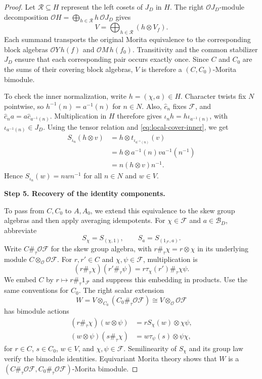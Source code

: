 \documentclass[11pt,a4paper]{article}
\theoremstyle{definition}
\theoremstyle{remark}
\numberwithin{equation}{section}
\newcommand{\cO}{\mathcal{O}}
\newcommand{\proofstep}[1]{%
	\par\addvspace{\medskipamount}%
	\noindent\textbf{#1}\par\nobreak
	\smallskip\nobreak\noindent\ignorespaces
}
\begin{document}
\begin{proof}
		Let $\mathcal R\subseteq H$ represent the left cosets of $J_D$
		in $H$. The right $\cO J_D$-module decomposition
		$\cO H=\bigoplus_{h\in\mathcal R}h\,\cO J_D$ gives
		\[
		V=\bigoplus_{h\in\mathcal R}(h\otimes V_f).
		\]
		Each summand transports the original Morita equivalence to the
		corresponding block algebras
		$\cO Y\,h(f)$ and $\cO M\,h(f_0)$.
		Transitivity and the common stabilizer $J_D$ ensure that each
		corresponding pair occurs exactly once.
		Since $C$ and $C_0$ are the sums of their covering block algebras,
		$V$ is therefore a $(C,C_0)$-Morita bimodule.
		
		To check the inner normalization, write $h=(\chi,a)\in H$.
		Character twists fix $N$ pointwise, so $h^{-1}(n)=a^{-1}(n)$
		for $n\in N$. Also, $\widehat c_n$ fixes $\mathcal F$, and
		$\widehat c_n a=a\widehat c_{a^{-1}(n)}$.
		Multiplication in $H$ therefore gives
		$\iota_n h=h\iota_{a^{-1}(n)}$, with $\iota_{a^{-1}(n)}\in J_D$.
		Using the tensor relation and \eqref{eq:local-cover-inner}, we get
		\[
		\begin{aligned}
			S_{\iota_n}(h\otimes v)
			&=h\otimes t_{\iota_{a^{-1}(n)}}(v)\\
			&=h\otimes a^{-1}(n)v a^{-1}(n^{-1})\\
			&=n(h\otimes v)n^{-1}.
		\end{aligned}
		\]
		Hence $S_{\iota_n}(w)=nwn^{-1}$ for all $n\in N$ and $w\in V$.
		
		\proofstep{Step 5. Recovery of the identity components.}
		To pass from $C,C_0$ to $A,A_0$, we extend this equivalence
		to the skew group algebras and then apply averaging idempotents.
		For $\chi\in\mathcal F$ and $a\in\mathcal B_D$, abbreviate
		\[
		S_\chi=S_{(\chi,1)},\qquad S_a=S_{(1_{\mathcal F},a)}.
		\]
		Write $C\#_\tau\cO\mathcal F$ for the skew group algebra,
		with $r\#_\tau\chi=r\otimes\chi$ in its underlying module
		$C\otimes_\cO\cO\mathcal F$.
		For $r,r'\in C$ and $\chi,\psi\in\mathcal F$, multiplication is
		\[
		(r\#_\tau\chi)(r'\#_\tau\psi)
		=r\tau_\chi(r')\#_\tau\chi\psi.
		\]
		We embed $C$ by $r\mapsto r\#_\tau1_{\mathcal F}$ and suppress
		this embedding in products. Use the same conventions for $C_0$.
		The right scalar extension
		\[
		W=V\otimes_{C_0}(C_0\#_\tau\cO\mathcal F)
		\cong V\otimes_\cO\cO\mathcal F
		\]
		has bimodule actions
		\[
		\begin{aligned}
			(r\#_\tau\chi)(w\otimes\psi)
			&=rS_\chi(w)\otimes\chi\psi,\\
			(w\otimes\psi)(s\#_\tau\chi)
			&=w\tau_\psi(s)\otimes\psi\chi,
		\end{aligned}
		\]
		for $r\in C$, $s\in C_0$, $w\in V$, and $\chi,\psi\in\mathcal F$.
		Semilinearity of $S_\chi$ and its group law verify the bimodule
		identities. Equivariant Morita theory
		\cite[Theorem~5.1.2]{Marcus1999} shows that $W$ is a
		$(C\#_\tau\cO\mathcal F,C_0\#_\tau\cO\mathcal F)$-Morita bimodule.
		

\end{proof}
\end{document}
